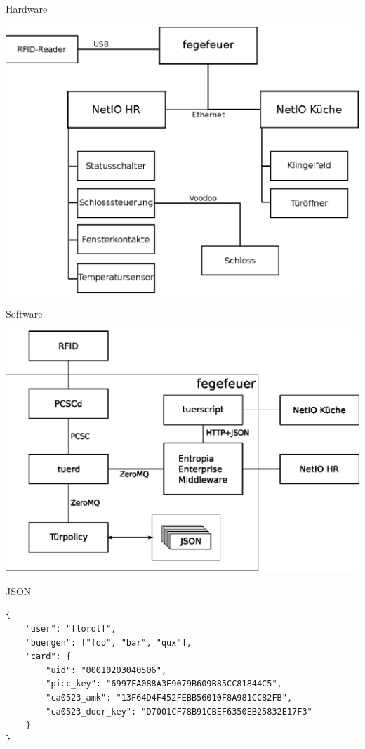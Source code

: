 \documentclass{beamer}
\begin{document}
\begin{frame}{Hardware}
  \begin{center}
    \includegraphics[height=.7\textheight]{hardware.eps}
  \end{center}
\end{frame}

\begin{frame}{Software}
  \begin{center}
    \includegraphics[height=.7\textheight]{software.eps}
  \end{center}
\end{frame}

\begin{frame}[fragile]{JSON}
  \begin{center}
    \begin{verbatim}
{
    "user": "florolf",
    "buergen": ["foo", "bar", "qux"],
    "card": {
        "uid": "00010203040506",
        "picc_key": "6997FA088A3E9079B609B85CC81844C5",
        "ca0523_amk": "13F64D4F452FEBB56010F8A981CC82FB",
        "ca0523_door_key": "D7001CF78B91CBEF6350EB25832E17F3"
    }
}
    \end{verbatim}
  \end{center}
\end{frame}
\end{document}
